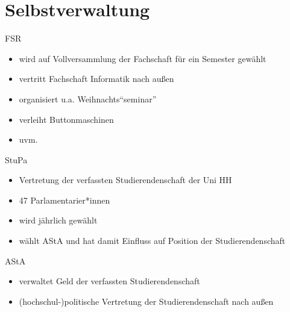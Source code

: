 \documentclass{beamer}
\begin{document}
\section{Selbstverwaltung}
\begin{frame}{FSR}
  \begin{itemize}
    \item wird auf Vollversammlung der Fachschaft für ein Semester gewählt
    \item vertritt Fachschaft Informatik nach außen
    \item organisiert u.a. Weihnachts"`seminar"'
    \item verleiht Buttonmaschinen
    \item uvm.
  \end{itemize}
\end{frame}
\begin{frame}{StuPa}
  \begin{itemize}
    \item Vertretung der verfassten Studierendenschaft der Uni HH
    \item 47 Parlamentarier*innen
    \item wird jährlich gewählt
    \item wählt AStA und hat damit Einfluss auf Position der Studierendenschaft
  \end{itemize}
\end{frame}
\begin{frame}{AStA}
  \begin{itemize}
    \item verwaltet Geld der verfassten Studierendenschaft
    \item (hochschul-)politische Vertretung der Studierendenschaft nach außen
  \end{itemize}	
\end{frame}
\end{document}
